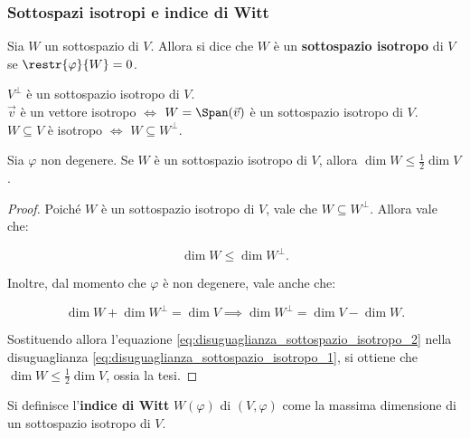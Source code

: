 \subsubsection{Sottospazi isotropi e indice di Witt}

\begin{definition}
	Sia $W$ un sottospazio di $V$. Allora si dice che $W$ è un \textbf{sottospazio isotropo} di $V$
	se $\restr{\varphi}{W} = 0$.
\end{definition}

\begin{remark}\nl
	\li $V^\perp$ è un sottospazio isotropo di $V$. \\
	\li $\vec{v}$ è un vettore isotropo $\iff$ $W = \Span(\vec v)$ è un sottospazio isotropo di $V$. \\
	\li $W \subseteq V$ è isotropo $\iff$ $W \subseteq W^\perp$.
\end{remark}

\begin{proposition} \label{prop:disuguaglianza_sottospazio_isotropo}
	Sia $\varphi$ non degenere. Se $W$ è un sottospazio isotropo di $V$, allora
	$\dim W \leq \frac{1}{2} \dim V$.
\end{proposition}

\begin{proof}
	Poiché $W$ è un sottospazio isotropo di $V$, vale che $W \subseteq W^\perp$. Allora vale che:
	
	\begin{equation} \label{eq:disuguaglianza_sottospazio_isotropo_1}
		\dim W \leq \dim W^\perp.
	\end{equation}
	
	\vskip 0.05in

	Inoltre, dal momento che $\varphi$ è non degenere, vale anche che:
	
	\begin{equation} \label{eq:disuguaglianza_sottospazio_isotropo_2}
		\dim W + \dim W^\perp = \dim V \implies \dim W^\perp = \dim V - \dim W.
	\end{equation}
	
	\vskip 0.05in
	 
	 Sostituendo allora l'equazione \eqref{eq:disuguaglianza_sottospazio_isotropo_2} nella disuguaglianza
	 \eqref{eq:disuguaglianza_sottospazio_isotropo_1}, si ottiene che $\dim W \leq \frac{1}{2} \dim V$,
	 ossia la tesi.
\end{proof}

\begin{definition}
	Si definisce l'\textbf{indice di Witt} $W(\varphi)$ di $(V, \varphi)$
	come la massima dimensione di un sottospazio isotropo di $V$. 
\end{definition}

